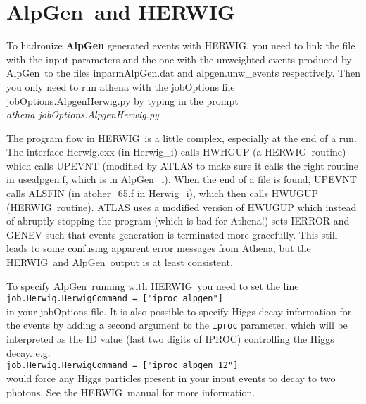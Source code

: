 \documentclass[11pt]{article}
\def\herwig{{HERWIG}}
\def\alpgen{{AlpGen}}
\begin{document}
\bigskip

\section{\alpgen\ and \herwig}

\noindent
To hadronize {\bf \alpgen} generated events with \herwig, you need to
link the file with the input parameters and the one with the
unweighted events produced by \alpgen\ to the files inparmAlpGen.dat
and alpgen.unw\_events respectively. Then you only need to run athena
with the jobOptions file jobOptions.AlpgenHerwig.py by typing in the
prompt \\ {\it athena jobOptions.AlpgenHerwig.py}\\

\medskip

\noindent
The program flow in \herwig\ is a little complex, especially at the
end of a run. The interface Herwig.cxx (in Herwig\_i) calls HWHGUP (a
\herwig\ routine) which calls UPEVNT (modified by ATLAS to make sure
it calls the right routine in usealpgen.f, which is in
AlpGen\_i). When the end of a file is found, UPEVNT calls ALSFIN (in
atoher\_65.f in Herwig\_i), which then calls HWUGUP (\herwig\
routine). ATLAS uses a modified version of HWUGUP which instead of
abruptly stopping the program (which is bad for Athena!) sets IERROR
and GENEV such that events generation is terminated more
gracefully. This still leads to some confusing apparent error messages
from Athena, but the \herwig\ and \alpgen\ output is at least
consistent.

\medskip

\noindent
To specify \alpgen\ running with \herwig\ you need to set the line\\
{\tt job.Herwig.HerwigCommand = ["iproc alpgen"]} \\
in your jobOptions file.  It is also possible to specify Higgs decay information 
for the events by adding a second argument to the {\tt iproc} parameter, 
which will be interpreted as the ID value (last two digits of IPROC) controlling 
the Higgs decay.  e.g. \\
{\tt job.Herwig.HerwigCommand = ["iproc alpgen 12"]}\\ 
would force any Higgs particles present in your input events to decay to two photons. See the \herwig\ manual for more information.
\end{document}
